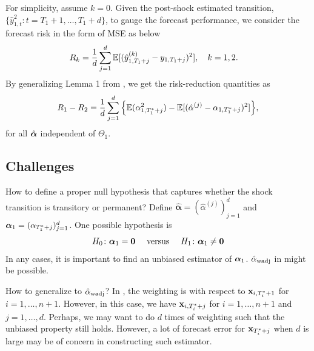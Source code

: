 \documentclass[12pt]{article}
\begin{document}
For simplicity, assume $k=0$. Given the post-shock estimated transition, $\{\hat{y}_{1, t}^2\colon t= T_1 +1, \ldots, T_1+d\}$, to gauge the forecast performance, we consider the forecast risk in the form of MSE as below
\begin{align*}
  R_k 
  &= \frac{1}{d} \sum_{j=1}^d \mathbb{E} [(\hat{y}_{1,T_1+j}^{(k)}-y_{1, T_1+j})^2] ,
  \quad k = 1, 2.
\end{align*}
By generalizing Lemma 1 from \citet{lin2020minimizing}, we get the risk-reduction quantities as
 \begin{align*}
     R_1-R_2 =\frac{1}{d} \sum_{j=1}^d  \Big\{ \mathbb{E} (\alpha_{1, T_1^*+j}^2) - \mathbb{E} [(\hat{\alpha}^{(j)}-\alpha_{1, T_1^*+j})^2]\Big\},
  \end{align*}
for all  $\hat{\boldsymbol{\alpha}}$ independent of $\Theta_1$.


\subsection{Challenges}

\begin{challenges}
  How to define a proper null hypothesis that captures whether the shock transition is  transitory or permanent?   Define $ \hat{\boldsymbol{\alpha}} = (\hat{\alpha}^{(j)})_{j=1}^d$ and $\boldsymbol{\alpha}_1= (\alpha_{T_1^*+j})_{j=1}^d$. One possible hypothesis is
  \begin{align*}
    H_0 \colon \boldsymbol{\alpha}_1=\boldsymbol{0} 
    \quad \text{ versus } \quad 
    H_1 \colon \boldsymbol{\alpha}_1 \neq \boldsymbol{0} 
  \end{align*}
  In any cases, it is important to find an unbiased estimator of $\boldsymbol{\alpha}_1$. $\hat{\alpha}_{\rm wadj}$ in \citep{lin2020minimizing} might be possible. 
\end{challenges}

\begin{challenges}
  How to generalize to $\hat{\alpha}_{\rm wadj}$? In \citep{lin2020minimizing}, the weighting is with respect to  $\mathbf{x}_{i, T_i^*+1}$ for $i = 1, \ldots, n+1$. However, in this case, we have $\mathbf{x}_{i, T_i^*+j}$ for $i = 1, \ldots, n+1$ and $j = 1, \ldots, d$. Perhaps, we may want to do $d$ times of weighting such that the unbiased  property still holds. However, a lot of forecast error for $\mathbf{x}_{T_i^*+j}$ when $d$ is large may be of concern in constructing such estimator.
\end{challenges}




\end{document}
